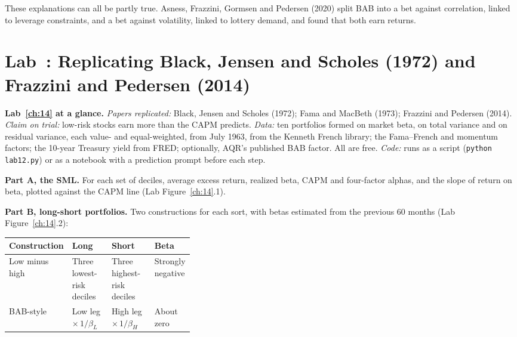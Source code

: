 These explanations can all be partly true. Asness, Frazzini, Gormsen and Pedersen (2020) split BAB into a bet against correlation, linked to leverage constraints, and a bet against volatility, linked to lottery demand, and found that both earn returns.

\section{Lab~\thechapter: Replicating Black, Jensen and Scholes (1972) and Frazzini and Pedersen (2014)}
\label{sec:18-lab}

\begin{callout}
\textbf{Lab~\ref{ch:14} at a glance.} \emph{Papers replicated:} Black, Jensen and Scholes (1972); Fama and MacBeth (1973); Frazzini and Pedersen (2014). \emph{Claim on trial:} low-risk stocks earn more than the CAPM predicts. \emph{Data:} ten portfolios formed on market beta, on total variance and on residual variance, each value- and equal-weighted, from July 1963, from the Kenneth French library; the Fama--French and momentum factors; the 10-year Treasury yield from FRED; optionally, AQR's published BAB factor. All are free. \emph{Code:} runs as a script (\texttt{python lab12.py}) or as a notebook with a prediction prompt before each step.
\end{callout}

\textbf{Part A, the SML.} For each set of deciles, average excess return, realized beta, CAPM and four-factor alphas, and the slope of return on beta, plotted against the CAPM line (Lab Figure~\ref{ch:14}.1).

\textbf{Part B, long-short portfolios.} Two constructions for each sort, with betas estimated from the previous 60 months (Lab Figure~\ref{ch:14}.2):

\begin{center}
\small
\begin{tabularx}{0.9\linewidth}{@{}>{\raggedright\arraybackslash}p{0.19\linewidth}>{\raggedright\arraybackslash}X>{\raggedright\arraybackslash}X>{\raggedright\arraybackslash}p{0.17\linewidth}@{}}
\toprule
Construction & Long & Short & Beta \\
\midrule
Low minus high & Three lowest-risk deciles & Three highest-risk deciles & Strongly negative \\
BAB-style & Low leg $\times\, 1/\beta_L$ & High leg $\times\, 1/\beta_H$ & About zero \\
\bottomrule
\end{tabularx}
\end{center}

